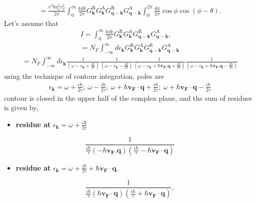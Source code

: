 \documentclass[aps,prb,amsmath,amssymb,footinbib,showpacs,twocolumn]{revtex4-2}
\begin{document}
\begin{widetext}
\begin{align}
   =\frac{e^{2}\hbar \eta^{2}_{v} v^{2}_{F}}{2\pi}\int_{0}^{\infty}\frac{kdk}{2\pi}G_{\mathbf{k}}^{\mathrm{R}} G_{\mathbf{k}}^{\mathrm{A}}G_{\mathbf{q-k}}^{\mathrm{R}} G_{\mathbf{q-k}}^{\mathrm{A}}\int_{0}^{2\pi}\frac{d\phi}{2\pi}\cos\phi\cos(\phi-\theta).
\end{align}
Let's assume that
\begin{align}
    I= \int_{0}^{\infty}\frac{kdk}{2\pi}G_{\mathbf{k}}^{\mathrm{R}} G_{\mathbf{k}}^{\mathrm{A}}G_{\mathbf{q-k}}^{\mathrm{R}} G_{\mathbf{q-k}}^{\mathrm{A}}, \\
    = N_{F}\int_{-\infty}^{\infty}d\epsilon_{\mathbf{k}}G_{\mathbf{k}}^{\mathrm{R}} G_{\mathbf{k}}^{\mathrm{A}}G_{\mathbf{q-k}}^{\mathrm{R}} G_{\mathbf{q-k}}^{\mathrm{A}}
   \end{align}
   \begin{align}
       = N_{F}\int_{-\infty}^{\infty}d\epsilon_{\mathbf{k}} \frac{1}{(\omega-\epsilon_{\mathbf{k}}+\frac{i\hbar}{2\tau})} \frac{1}{(\omega-\epsilon_{\mathbf{k}}-\frac{i\hbar}{2\tau})}\frac{1}{(\omega-\epsilon_{\mathbf{k}}+\hbar \mathbf{v_{F}.q}+\frac{i\hbar}{2\tau})}\frac{1}{(\omega-\epsilon_{\mathbf{k}}+\hbar \mathbf{v_{F}.q}-\frac{i\hbar}{2\tau})}
   \end{align}
using the technique of contour integration, poles are
\begin{align}
 \epsilon_{\mathbf{k}}=  \omega+\frac{i\hbar}{2\tau} ;\   \omega-\frac{i\hbar}{2\tau}; \ \omega+\hbar \mathbf{v_{F}\cdot q}+\frac{i\hbar}{2\tau};\ \omega+\hbar \mathbf{v_{F}\cdot q}-\frac{i\hbar}{2\tau}
\end{align}
contour is closed in the upper half of the complex plane, and the sum of residues is given by,
\begin{itemize}
    \item \textbf{residue at} $\epsilon_{\mathbf{k}}=  \omega+\frac{i\hbar}{2\tau}$
\end{itemize}
\begin{equation}
    \frac{1}{\frac{i\hbar}{\tau}(-\hbar \mathbf{v_{F}.q})(\frac{i\hbar}{\tau}-\hbar \mathbf{v_{F}\cdot q})}
\end{equation}
\begin{itemize}
    \item \textbf{residue at} $\epsilon_{\mathbf{k}}=  \omega+\frac{i\hbar}{2\tau}+\hbar \mathbf{v_{F} \cdot q}$,
\end{itemize}
\begin{equation}
    \frac{1}{\frac{i\hbar}{\tau}(\hbar \mathbf{v_{F} \cdot q})(\frac{i\hbar}{\tau}+\hbar \mathbf{v_{F} \cdot q})},

\end{equation}
\end{widetext}
\end{document}
